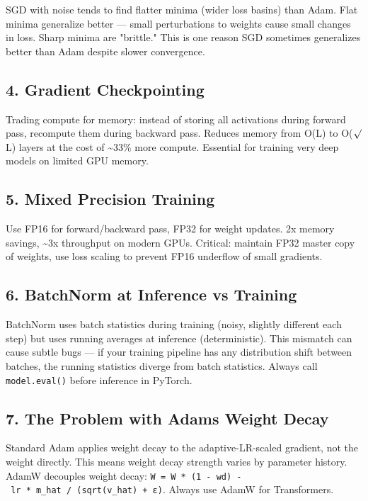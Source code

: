 \documentclass[11pt]{article}
\begin{document}
SGD with noise tends to find flatter minima (wider loss basins) than Adam. Flat minima generalize better --- small perturbations to weights cause small changes in loss. Sharp minima are "brittle." This is one reason SGD sometimes generalizes better than Adam despite slower convergence.

\subsection{4. Gradient Checkpointing}\label{4-gradient-checkpointing}

Trading compute for memory: instead of storing all activations during forward pass, recompute them during backward pass. Reduces memory from O(L) to O(\(\surd\)L) layers at the cost of \textasciitilde33\% more compute. Essential for training very deep models on limited GPU memory.

\subsection{5. Mixed Precision Training}\label{5-mixed-precision-training}

Use FP16 for forward/backward pass, FP32 for weight updates. 2x memory savings, \textasciitilde3x throughput on modern GPUs. Critical: maintain FP32 master copy of weights, use loss scaling to prevent FP16 underflow of small gradients.

\subsection{6. BatchNorm at Inference vs Training}\label{6-batchnorm-at-inference-vs-training}

BatchNorm uses batch statistics during training (noisy, slightly different each step) but uses running averages at inference (deterministic). This mismatch can cause subtle bugs --- if your training pipeline has any distribution shift between batches, the running statistics diverge from batch statistics. Always call \texttt{model.eval()} before inference in PyTorch.

\subsection{7. The Problem with Adam\textquotesingle s Weight Decay}\label{7-the-problem-with-adams-weight-decay}

Standard Adam applies weight decay to the adaptive-LR-scaled gradient, not the weight directly. This means weight decay strength varies by parameter history. AdamW decouples weight decay: \texttt{W\ =\ W\ *\ (1\ -\ wd)\ -\ lr\ *\ m\_hat\ /\ (sqrt(v\_hat)\ +\ ε)}. Always use AdamW for Transformers.
\end{document}

